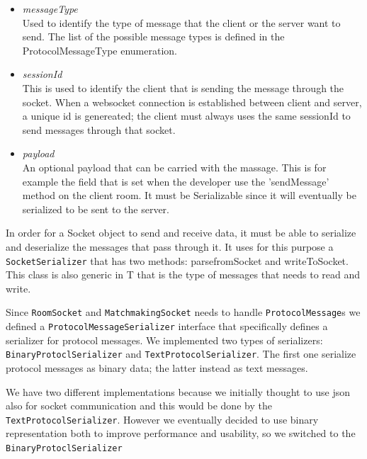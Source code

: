 \begin{itemize}
	\item \textit{messageType} \\
	Used to identify the type of message that the client or the server want to send. The list of the possible message types is defined in the ProtocolMessageType enumeration.
	\item \textit{sessionId} \\
	This is used to identify the client that is sending the message through the socket. When a websocket connection is established between client and server, a unique id is genereated; the client must always uses the same sessionId to send messages through that socket.
	\item \textit{payload} \\ 
	An optional payload that can be carried with the massage. This is for example the field that is set when the developer use the 'sendMessage' method on the client room. It must be Serializable since it will eventually be serialized to be sent to the server.
\end{itemize}

In order for a Socket object to send and receive data, it must be able to serialize and deserialize the messages that pass through it. It uses for this purpose a \texttt{SocketSerializer} that has two methods: parsefromSocket and writeToSocket. This class is also generic in T that is the type of messages that needs to read and write.

Since \texttt{RoomSocket} and \texttt{MatchmakingSocket} needs to handle \texttt{ProtocolMessage}s we defined a \texttt{ProtocolMessageSerializer} interface that specifically defines a serializer for protocol messages. We implemented two types of serializers: \texttt{BinaryProtoclSerializer} and \texttt{TextProtocolSerializer}. The first one serialize protocol messages as binary data; the latter instead as text messages.
 
We have two different implementations because we initially thought to use json also for socket communication and this would be done by the \texttt{TextProtocolSerializer}. However we eventually decided to use binary representation both to improve performance and usability, so we switched to the \texttt{BinaryProtoclSerializer}


